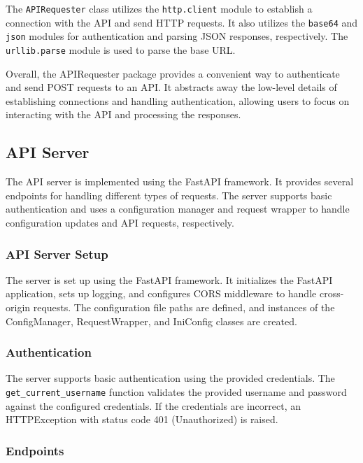 \documentclass{article}
\begin{document}
The \texttt{APIRequester} class utilizes the \texttt{http.client} module to establish a 
connection with the API and send HTTP requests. It also utilizes the \texttt{base64} and 
\texttt{json} modules for authentication and parsing JSON responses, respectively. 
The \texttt{urllib.parse} module is used to parse the base URL.

Overall, the APIRequester package provides a convenient way to authenticate and send POST 
requests to an API. It abstracts away the low-level details of establishing connections and 
handling authentication, allowing users to focus on interacting with the API and processing the 
responses.

\subsection{API Server}

The API server is implemented using the FastAPI framework. It provides several endpoints for 
handling different types of requests. The server supports basic authentication and uses a 
configuration manager and request wrapper to handle configuration updates and API requests, 
respectively.

\subsubsection{API Server Setup}

The server is set up using the FastAPI framework. It initializes the FastAPI application, sets 
up logging, and configures CORS middleware to handle cross-origin requests. The configuration 
file paths are defined, and instances of the ConfigManager, RequestWrapper, and IniConfig 
classes are created.

\subsubsection{Authentication}

The server supports basic authentication using the provided credentials. 
The \texttt{get\_current\_username} function validates the provided username and password 
against the configured credentials. If the credentials are incorrect, an HTTPException with 
status code 401 (Unauthorized) is raised.

\subsubsection{Endpoints}
\end{document}
